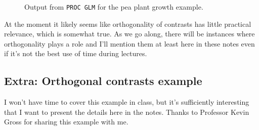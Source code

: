 \documentclass[a4paper, 12pt]{article}
\theoremstyle{plain}
\theoremstyle{definition}
\theoremstyle{remark}
\begin{document}
\begin{figure}[t]
\begin{center}
\end{center}
\caption{Output from {\tt PROC GLM} for the pea plant growth example.}
\label{fig:pea.output}
\end{figure}

At the moment it likely seems like orthogonality of contrasts has little practical relevance, which is somewhat true.  As we go along, there will be instances where orthogonality plays a role and I'll mention them at least here in these notes even if it's not the best use of time during lectures.  


\subsection*{Extra: Orthogonal contrasts example}

I won't have time to cover this example in class, but it's sufficiently interesting that I want to present the details here in the notes.  Thanks to Professor Kevin Gross for sharing this example with me.  
\end{document}

